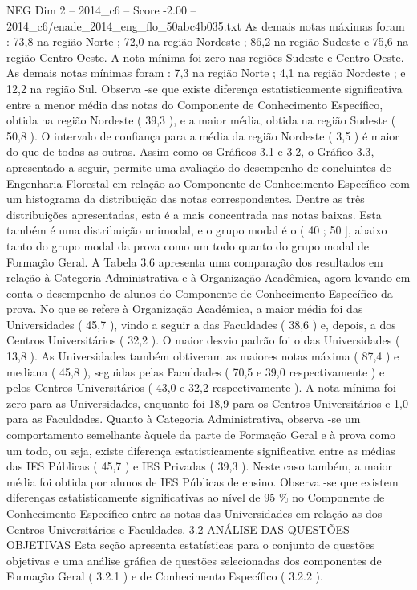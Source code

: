 \begin{textsample}{NEG Dim 2 – 2014\_c6 – Score -2.00 – 2014\_c6/enade\_2014\_eng\_flo\_50abc4b035.txt}
As demais notas máximas foram : 73,8 na região Norte ; 72,0 na região Nordeste ; 86,2 na região Sudeste e 75,6 na região Centro-Oeste.
A nota mínima foi zero nas regiões Sudeste e Centro-Oeste.
As demais notas mínimas foram : 7,3 na região Norte ; 4,1 na região Nordeste ; e 12,2 na região Sul.
Observa -se que existe diferença estatisticamente significativa entre a menor média das notas do Componente de Conhecimento Específico, obtida na região Nordeste ( 39,3 ), e a maior média, obtida na região Sudeste ( 50,8 ).
O intervalo de confiança para a média da região Nordeste ( 3,5 ) é maior do que de todas as outras.
Assim como os Gráficos 3.1 e 3.2, o Gráfico 3.3, apresentado a seguir, permite uma avaliação do desempenho de concluintes de Engenharia Florestal em relação ao Componente de Conhecimento Específico com um histograma da distribuição das notas correspondentes.
Dentre as três distribuições apresentadas, esta é a mais concentrada nas notas baixas.
Esta também é uma distribuição unimodal, e o grupo modal é o ( 40 ; 50 ], abaixo tanto do grupo modal da prova como um todo quanto do grupo modal de Formação Geral.
A Tabela 3.6 apresenta uma comparação dos resultados em relação à Categoria Administrativa e à Organização Acadêmica, agora levando em conta o desempenho de alunos do Componente de Conhecimento Específico da prova.
No que se refere à Organização Acadêmica, a maior média foi das Universidades ( 45,7 ), vindo a seguir a das Faculdades ( 38,6 ) e, depois, a dos Centros Universitários ( 32,2 ).
O maior desvio padrão foi o das Universidades ( 13,8 ).
As Universidades também obtiveram as maiores notas máxima ( 87,4 ) e mediana ( 45,8 ), seguidas pelas Faculdades ( 70,5 e 39,0 respectivamente ) e pelos Centros Universitários ( 43,0 e 32,2 respectivamente ).
A nota mínima foi zero para as Universidades, enquanto foi 18,9 para os Centros Universitários e 1,0 para as Faculdades.
Quanto à Categoria Administrativa, observa -se um comportamento semelhante àquele da parte de Formação Geral e à prova como um todo, ou seja, existe diferença estatisticamente significativa entre as médias das IES Públicas ( 45,7 ) e IES Privadas ( 39,3 ).
Neste caso também, a maior média foi obtida por alunos de IES Públicas de ensino.
Observa -se que existem diferenças estatisticamente significativas ao nível de 95 \% no Componente de Conhecimento Específico entre as notas das Universidades em relação as dos Centros Universitários e Faculdades. 3.2 ANÁLISE DAS QUESTÕES OBJETIVAS Esta seção apresenta estatísticas para o conjunto de questões objetivas e uma análise gráfica de questões selecionadas dos componentes de Formação Geral ( 3.2.1 ) e de Conhecimento Específico ( 3.2.2 ).

\end{textsample}
